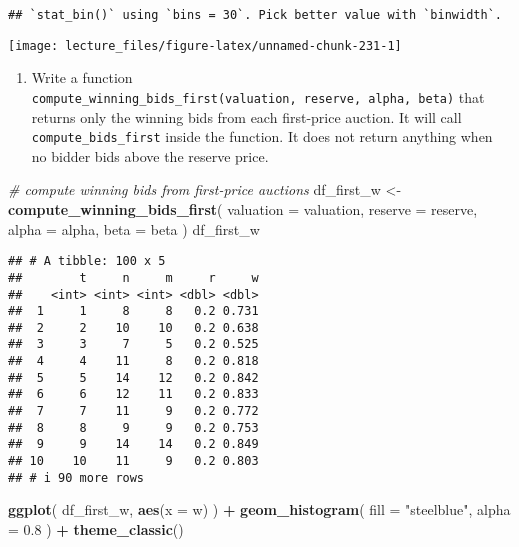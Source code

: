 \documentclass[
]{book}
\newenvironment{Shaded}{\begin{snugshade}}{\end{snugshade}}
\newcommand{\AttributeTok}[1]{\textcolor[rgb]{0.13,0.29,0.53}{#1}}
\newcommand{\CommentTok}[1]{\textcolor[rgb]{0.56,0.35,0.01}{\textit{#1}}}
\newcommand{\FloatTok}[1]{\textcolor[rgb]{0.00,0.00,0.81}{#1}}
\newcommand{\FunctionTok}[1]{\textcolor[rgb]{0.13,0.29,0.53}{\textbf{#1}}}
\newcommand{\NormalTok}[1]{#1}
\newcommand{\OtherTok}[1]{\textcolor[rgb]{0.56,0.35,0.01}{#1}}
\newcommand{\SpecialCharTok}[1]{\textcolor[rgb]{0.81,0.36,0.00}{\textbf{#1}}}
\newcommand{\StringTok}[1]{\textcolor[rgb]{0.31,0.60,0.02}{#1}}
\providecommand{\tightlist}{%
  \setlength{\itemsep}{0pt}\setlength{\parskip}{0pt}}
\begin{document}
\begin{verbatim}
## `stat_bin()` using `bins = 30`. Pick better value with `binwidth`.
\end{verbatim}

\begin{center}\texttt{[image: lecture\_files/figure-latex/unnamed-chunk-231-1]} \end{center}

\begin{enumerate}
\def\labelenumi{\arabic{enumi}.}
\setcounter{enumi}{5}
\tightlist
\item
  Write a function \texttt{compute\_winning\_bids\_first(valuation,\ reserve,\ alpha,\ beta)} that returns only the winning bids from each first-price auction. It will call \texttt{compute\_bids\_first} inside the function. It does not return anything when no bidder bids above the reserve price.
\end{enumerate}

\begin{Shaded}
\begin{Highlighting}[]
\CommentTok{\# compute winning bids from first{-}price auctions}
\NormalTok{df\_first\_w }\OtherTok{\textless{}{-}}
  \FunctionTok{compute\_winning\_bids\_first}\NormalTok{(}
    \AttributeTok{valuation =}\NormalTok{ valuation,}
    \AttributeTok{reserve =}\NormalTok{ reserve,}
    \AttributeTok{alpha =}\NormalTok{ alpha,}
    \AttributeTok{beta =}\NormalTok{ beta}
\NormalTok{    )}
\NormalTok{df\_first\_w}
\end{Highlighting}
\end{Shaded}

\begin{verbatim}
## # A tibble: 100 x 5
##        t     n     m     r     w
##    <int> <int> <int> <dbl> <dbl>
##  1     1     8     8   0.2 0.731
##  2     2    10    10   0.2 0.638
##  3     3     7     5   0.2 0.525
##  4     4    11     8   0.2 0.818
##  5     5    14    12   0.2 0.842
##  6     6    12    11   0.2 0.833
##  7     7    11     9   0.2 0.772
##  8     8     9     9   0.2 0.753
##  9     9    14    14   0.2 0.849
## 10    10    11     9   0.2 0.803
## # i 90 more rows
\end{verbatim}

\begin{Shaded}
\begin{Highlighting}[]
\FunctionTok{ggplot}\NormalTok{(}
\NormalTok{  df\_first\_w, }
  \FunctionTok{aes}\NormalTok{(}\AttributeTok{x =}\NormalTok{ w)}
\NormalTok{  ) }\SpecialCharTok{+} 
  \FunctionTok{geom\_histogram}\NormalTok{(}
    \AttributeTok{fill =} \StringTok{"steelblue"}\NormalTok{, }
    \AttributeTok{alpha =} \FloatTok{0.8}
\NormalTok{    ) }\SpecialCharTok{+} 
  \FunctionTok{theme\_classic}\NormalTok{()}
\end{Highlighting}
\end{Shaded}
\end{document}
